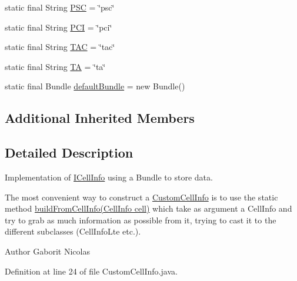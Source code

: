 \begin{DoxyCompactItemize}
\item 
static final String \hyperlink{classcom_1_1qualoutdoor_1_1recorder_1_1telephony_1_1CustomCellInfo_a350eb321837733c01ad938780171b5d9}{P\-S\-C} = \char`\"{}psc\char`\"{}
\item 
static final String \hyperlink{classcom_1_1qualoutdoor_1_1recorder_1_1telephony_1_1CustomCellInfo_adab6d65fadb5d7a446f5a8c10eab8a79}{P\-C\-I} = \char`\"{}pci\char`\"{}
\item 
static final String \hyperlink{classcom_1_1qualoutdoor_1_1recorder_1_1telephony_1_1CustomCellInfo_a67566ea7b47531de3a99e6aea5225212}{T\-A\-C} = \char`\"{}tac\char`\"{}
\item 
static final String \hyperlink{classcom_1_1qualoutdoor_1_1recorder_1_1telephony_1_1CustomCellInfo_a87dd7521694de75516af18a053fd2701}{T\-A} = \char`\"{}ta\char`\"{}
\item 
static final Bundle \hyperlink{classcom_1_1qualoutdoor_1_1recorder_1_1telephony_1_1CustomCellInfo_a43d9dc5eb9e584f508a67fc2ace6c61c}{default\-Bundle} = new Bundle()
\end{DoxyCompactItemize}
\subsection*{Additional Inherited Members}


\subsection{Detailed Description}
Implementation of \hyperlink{interfacecom_1_1qualoutdoor_1_1recorder_1_1telephony_1_1ICellInfo}{I\-Cell\-Info} using a Bundle to store data.

The most convenient way to construct a \hyperlink{classcom_1_1qualoutdoor_1_1recorder_1_1telephony_1_1CustomCellInfo}{Custom\-Cell\-Info} is to use the static method {\ttfamily \hyperlink{classcom_1_1qualoutdoor_1_1recorder_1_1telephony_1_1CustomCellInfo_a361d82a592568ef3a648a4e2273fbc84}{build\-From\-Cell\-Info(\-Cell\-Info cell)}} which take as argument a Cell\-Info and try to grab as much information as possible from it, trying to cast it to the different subclasses (Cell\-Info\-Lte etc.).

\begin{DoxyAuthor}{Author}
Gaborit Nicolas 
\end{DoxyAuthor}


Definition at line 24 of file Custom\-Cell\-Info.\-java.



